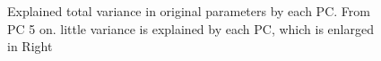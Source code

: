 \begin{figure}[h]
    \begin{center}
    \end{center}

    \caption[Explained total variance in original parameters by each PC]{Explained total variance in original parameters by each PC. From PC 5 on. little variance is explained by each PC, which is enlarged in Right}
    \label{fig:pc}
\end{figure}

